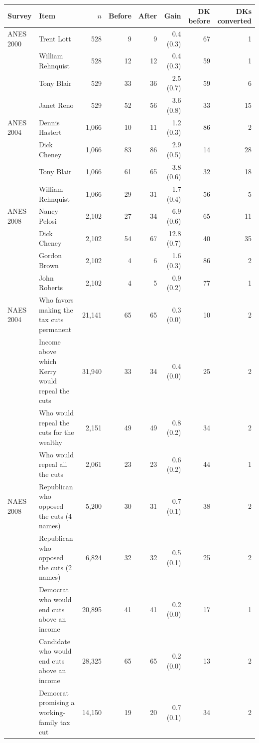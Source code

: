 \begin{tabular}{llrrrrrr}
\toprule
Survey & Item & $n$ & Before & After & Gain & DK before & DKs converted \\
\midrule
ANES 2000 & Trent Lott & 528 & 9 & 9 & 0.4 (0.3) & 67 & 1 \\
 & William Rehnquist & 528 & 12 & 12 & 0.4 (0.3) & 59 & 1 \\
 & Tony Blair & 529 & 33 & 36 & 2.5 (0.7) & 59 & 6 \\
 & Janet Reno & 529 & 52 & 56 & 3.6 (0.8) & 33 & 15 \\
ANES 2004 & Dennis Hastert & 1,066 & 10 & 11 & 1.2 (0.3) & 86 & 2 \\
 & Dick Cheney & 1,066 & 83 & 86 & 2.9 (0.5) & 14 & 28 \\
 & Tony Blair & 1,066 & 61 & 65 & 3.8 (0.6) & 32 & 18 \\
 & William Rehnquist & 1,066 & 29 & 31 & 1.7 (0.4) & 56 & 5 \\
ANES 2008 & Nancy Pelosi & 2,102 & 27 & 34 & 6.9 (0.6) & 65 & 11 \\
 & Dick Cheney & 2,102 & 54 & 67 & 12.8 (0.7) & 40 & 35 \\
 & Gordon Brown & 2,102 & 4 & 6 & 1.6 (0.3) & 86 & 2 \\
 & John Roberts & 2,102 & 4 & 5 & 0.9 (0.2) & 77 & 1 \\
NAES 2004 & Who favors making the tax cuts permanent & 21,141 & 65 & 65 & 0.3 (0.0) & 10 & 2 \\
 & Income above which Kerry would repeal the cuts & 31,940 & 33 & 34 & 0.4 (0.0) & 25 & 2 \\
 & Who would repeal the cuts for the wealthy & 2,151 & 49 & 49 & 0.8 (0.2) & 34 & 2 \\
 & Who would repeal all the cuts & 2,061 & 23 & 23 & 0.6 (0.2) & 44 & 1 \\
NAES 2008 & Republican who opposed the cuts (4 names) & 5,200 & 30 & 31 & 0.7 (0.1) & 38 & 2 \\
 & Republican who opposed the cuts (2 names) & 6,824 & 32 & 32 & 0.5 (0.1) & 25 & 2 \\
 & Democrat who would end cuts above an income & 20,895 & 41 & 41 & 0.2 (0.0) & 17 & 1 \\
 & Candidate who would end cuts above an income & 28,325 & 65 & 65 & 0.2 (0.0) & 13 & 2 \\
 & Democrat promising a working-family tax cut & 14,150 & 19 & 20 & 0.7 (0.1) & 34 & 2 \\
\bottomrule
\end{tabular}
